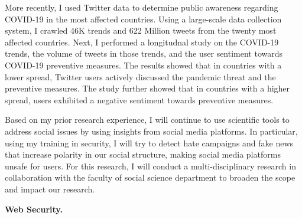 \documentclass{NSF}
\newcommand{\BfPara}[1]{{\noindent\textbf{#1.}}\xspace}
\begin{document}
More recently, I used Twitter data to determine public awareness regarding COVID-19 in the most affected countries. Using a large-scale data collection system, I crawled 46K trends and 622 Million tweets from the twenty most affected countries. Next, I performed a longitudnal study on the COVID-19 trends, the volume of tweets in those trends, and the user sentiment towards COVID-19 preventive measures. The results showed that in countries with a lower spread, Twitter users actively discussed the pandemic threat and the preventive measures. The study further showed that in countries with a higher spread, users exhibited a negative sentiment towards preventive measures. 

Based on my prior research experience, I will continue to use scientific tools to address social issues by using insights from social media platforms. In particular, using my training in security, I will try to detect hate campaigns and fake news that increase polarity in our social structure, making social media platforms unsafe for users. For this research, I will conduct a multi-disciplinary research in collaboration with the faculty of social science department to broaden the scope and impact our research.  

\BfPara{Web Security}
\end{document}
